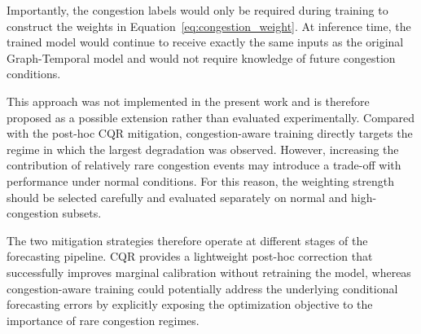 Importantly, the congestion labels would only be required during training
to construct the weights in Equation~\ref{eq:congestion_weight}. At inference
time, the trained model would continue to receive exactly the same inputs as
the original Graph-Temporal model and would not require knowledge of future
congestion conditions.

This approach was not implemented in the present work and is therefore
proposed as a possible extension rather than evaluated experimentally.
Compared with the post-hoc CQR mitigation, congestion-aware training directly
targets the regime in which the largest degradation was observed. However,
increasing the contribution of relatively rare congestion events may introduce
a trade-off with performance under normal conditions. For this reason, the
weighting strength should be selected carefully and evaluated separately on
normal and high-congestion subsets.

The two mitigation strategies therefore operate at different stages of the
forecasting pipeline. CQR provides a lightweight post-hoc correction that
successfully improves marginal calibration without retraining the model,
whereas congestion-aware training could potentially address the underlying
conditional forecasting errors by explicitly exposing the optimization
objective to the importance of rare congestion regimes.